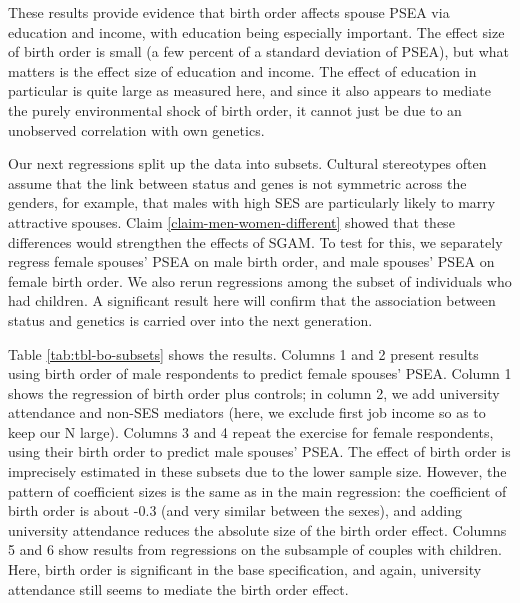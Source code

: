 \documentclass[
  12pt,
]{article}
\theoremstyle{definition}
\theoremstyle{definition}
\theoremstyle{definition}
\theoremstyle{definition}
\theoremstyle{remark}
\begin{document}
These results provide evidence that birth order affects spouse PSEA via
education and income, with education being especially important. The effect
size of birth order is small (a few percent of a standard deviation of PSEA),
but what matters is the effect size of education and income. The effect of
education in particular is quite large as measured here, and since it
also appears to mediate the purely environmental shock of birth order, it
cannot just be due to an unobserved correlation with own genetics.

Our next regressions split up the data into subsets. Cultural stereotypes often
assume that the link between status and genes is not symmetric across the
genders, for example, that males with high SES are particularly likely to marry
attractive spouses. Claim \ref{claim-men-women-different} showed that these
differences would strengthen the effects of SGAM. To test for this, we
separately regress female spouses' PSEA on male birth order, and male spouses'
PSEA on female birth order. We also rerun regressions among the subset of
individuals who had children. A significant result here will confirm that the
association between status and genetics is carried over into the next
generation.

Table \ref{tab:tbl-bo-subsets} shows the results. Columns 1 and 2 present
results using birth order of male respondents to predict female spouses' PSEA.
Column 1 shows the regression of birth order plus controls; in column 2, we add
university attendance and non-SES mediators (here, we exclude first job income
so as to keep our N large). Columns 3 and 4 repeat the exercise for female
respondents, using their birth order to predict male spouses' PSEA. The effect of
birth order is imprecisely estimated in these subsets due to the lower sample
size. However, the pattern of coefficient sizes is the same as in the main
regression: the coefficient of birth order is about -0.3 (and very similar
between the sexes), and adding university attendance reduces the absolute size
of the birth order effect. Columns 5 and 6 show results from regressions on
the subsample of couples with children. Here, birth order is significant in the
base specification, and again, university attendance still seems to mediate the
birth order effect.

 
  \providecommand{\huxb}[2]{\arrayrulecolor[RGB]{#1}\global\arrayrulewidth=#2pt}
  \providecommand{\huxvb}[2]{\color[RGB]{#1}\vrule width #2pt}
  \providecommand{\huxtpad}[1]{\rule{0pt}{#1}}
  \providecommand{\huxbpad}[1]{\rule[-#1]{0pt}{#1}}
\end{document}
